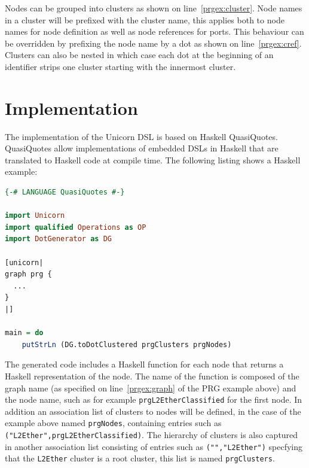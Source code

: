 \documentclass[a4paper]{article}
\begin{document}
Nodes can be grouped into clusters as shown on line~\ref{prgex:cluster}. Node
names in a cluster will be prefixed with the cluster name, this applies both to
node names for node definition as well as node references for ports. This
behaviour can be overridden by prefixing the node name by a dot as shown on
line~\ref{prgex:cref}. Clusters can also be nested in which case each dot at the
beginning of an identifier strips one cluster starting with the innermost cluster.




\section*{Implementation}
The implementation of the Unicorn DSL is based on Haskell QuasiQuotes.
QuasiQuotes allow implementations of embedded DSLs in Haskell that are
translated to Haskell code at compile time. The following listing shows a
Haskell example:

\begin{lstlisting}[language=haskell]
{-# LANGUAGE QuasiQuotes #-}

import Unicorn
import qualified Operations as OP
import DotGenerator as DG

[unicorn|
graph prg {
  ...
}
|]

main = do
    putStrLn (DG.toDotClustered prgClusters prgNodes)
\end{lstlisting}

The generated code includes a Haskell function for each node that returns a
Haskell representation of the node. The name of the function is composed of the
graph name (as specified on line~\ref{prgex:graph} of the PRG example above) and
the node name, such as for example \texttt{prgL2EtherClassified} for the first
node. In addition an association list of clusters to nodes will be defined, in
the case of the example above named \texttt{prgNodes}, containing entries such
as \lstinline!("L2Ether",prgL2EtherClassified)!. The hierarchy of clusters is
also captured in another association list consisting of entries such as
\lstinline!("","L2Ether")! specfying that the \texttt{L2Ether} cluster is a root
cluster, this list is named \texttt{prgClusters}.
\end{document}
